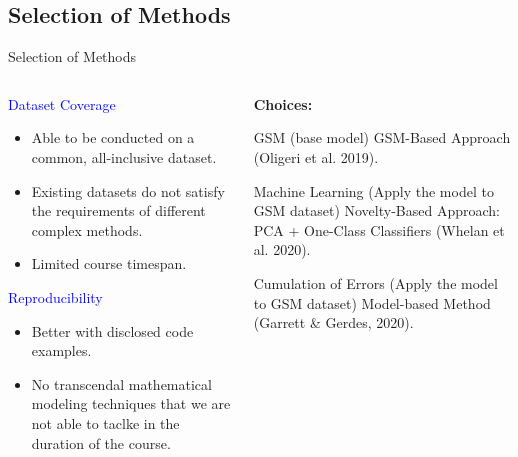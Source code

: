 \documentclass[aspectratio=169, 8pt]{beamer}
\begin{document}
\subsection{Selection of Methods}
\begin{frame}{Selection of Methods}


\begin{columns}
    \begin{column}{0.5 \linewidth}
        \textcolor{blue}{Dataset Coverage}
        \begin{itemize}
            \item Able to be conducted on a common, all-inclusive dataset.
            \item Existing datasets do not satisfy the requirements of different complex methods.
            \item Limited course timespan.
        \end{itemize}
        
        \textcolor{blue}{Reproducibility}
        \begin{itemize}
            \item Better with disclosed code examples.
            \item No transcendal mathematical modeling techniques that we are not able to taclke in the duration of the course.
        \end{itemize}
    \end{column}
    

    \begin{column}{0.5 \linewidth}
        \textbf{Choices:}

        \begin{block}{GSM (base model)}
            GSM-Based Approach (Oligeri et al. 2019).
        \end{block}

        \begin{block}{Machine Learning (Apply the model to GSM dataset)}
            Novelty-Based Approach: PCA + One-Class Classifiers (Whelan et al. 2020).
        \end{block}

        \begin{block}{Cumulation of Errors (Apply the model to GSM dataset)}
            Model-based Method (Garrett \& Gerdes, 2020).
        \end{block}
    \end{column}
\end{columns}



\end{frame}
\end{document}
